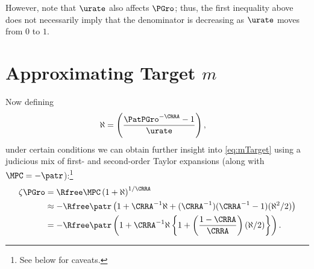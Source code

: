 \documentclass{\handout}
\begin{document}
However, note that $\urate$ also affects $\PGro$; thus, the first inequality above does
not necessarily imply that the denominator is decreasing as $\urate$ moves from $0$ to $1$.


\section{Approximating Target $m$}

Now defining
\begin{equation}\begin{gathered}\begin{aligned}
  \aleph & =  \left(\frac{\PatPGro^{-\CRRA} - 1}{\urate}\right),
\end{aligned}\end{gathered}\end{equation}
under certain conditions we can obtain further insight into \eqref{eq:mTarget} using a judicious mix of first- and second-order Taylor expansions (along with $\MPCU = -\patr$):\footnote{See below for caveats.}
\begin{equation}\begin{gathered}\begin{aligned}
  \label{eq:zetaExp}
  \zeta\PGro & =  \Rfree \MPCU \left(1+\aleph\right)^{1/\CRRA}
\\ & \approx  -\Rfree \patr \left(1+\CRRA^{-1}\aleph+(\CRRA^{-1})(\CRRA^{-1}-1)(\aleph^{2}/2)\right)
\\ & =  -\Rfree \patr \left(1+\CRRA^{-1}\aleph\left\{1+\left(\frac{1-\CRRA}{\CRRA}\right)(\aleph/2)\right\}\right) %
.
\end{aligned}\end{gathered}\end{equation}
\end{document}

